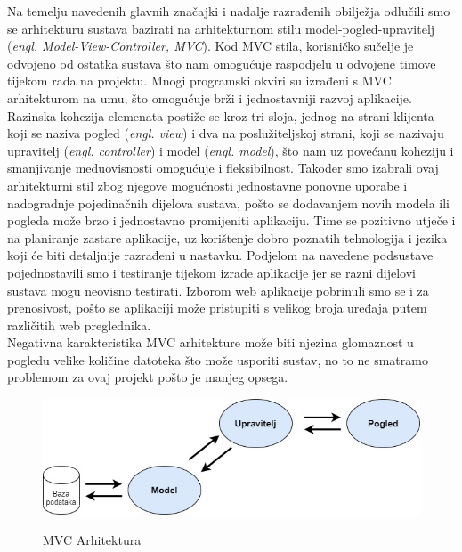 	\textnormal{Na temelju navedenih glavnih značajki i nadalje razrađenih obilježja odlučili smo se arhitekturu sustava bazirati na arhitekturnom stilu model-pogled-upravitelj (\textit{engl. Model-View-Controller, MVC}). Kod MVC stila, korisničko sučelje je odvojeno od ostatka sustava što nam omogućuje raspodjelu u odvojene timove tijekom rada na projektu. Mnogi programski okviri su izrađeni s MVC arhitekturom na umu, što omogućuje brži i jednostavniji razvoj aplikacije. Razinska kohezija elemenata postiže se kroz tri sloja, jednog na strani klijenta koji se naziva pogled (\textit{engl. view}) i dva na poslužiteljskoj strani, koji se nazivaju upravitelj (\textit{engl. controller}) i model (\textit{engl. model}), što nam uz povećanu koheziju i smanjivanje međuovisnosti omogućuje i fleksibilnost. Također smo izabrali ovaj arhitekturni stil zbog njegove mogućnosti jednostavne ponovne uporabe i nadogradnje pojedinačnih dijelova sustava, pošto se dodavanjem novih modela ili pogleda može brzo i jednostavno promijeniti aplikaciju. Time se pozitivno utječe i na planiranje zastare aplikacije, uz korištenje dobro poznatih tehnologija i jezika koji će biti detaljnije razrađeni u nastavku. Podjelom na navedene podsustave pojednostavili smo i testiranje tijekom izrade aplikacije jer se razni dijelovi sustava mogu neovisno testirati. Izborom web aplikacije pobrinuli smo se i za prenosivost, pošto se aplikaciji može pristupiti s velikog broja uređaja putem različitih web preglednika.}\\
	
	\textnormal{Negativna karakteristika MVC arhitekture može biti njezina glomaznost u pogledu velike količine datoteka što može usporiti sustav, no to ne smatramo problemom za ovaj projekt pošto je manjeg opsega.}\\
	
	\begin{figure}[H]
		\centering
		\includegraphics[scale=0.5]{slike/MVC} \\
		\caption{ MVC Arhitektura}
		\label{fig:arhitekturaMCV}
	\end{figure}

